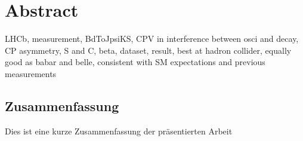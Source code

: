 \clearpage
\thispagestyle{empty}

\section*{Abstract}
LHCb, measurement, BdToJpsiKS, CPV in interference between osci and decay, CP asymmetry, S and C, beta, dataset, result, best at hadron collider, equally good as babar and belle, consistent with SM expectations and previous measurements


\begin{german}
\section*{Zusammenfassung}
Dies ist eine kurze Zusammenfassung der präsentierten Arbeit

\end{german}

\setcounter{page}{1}

